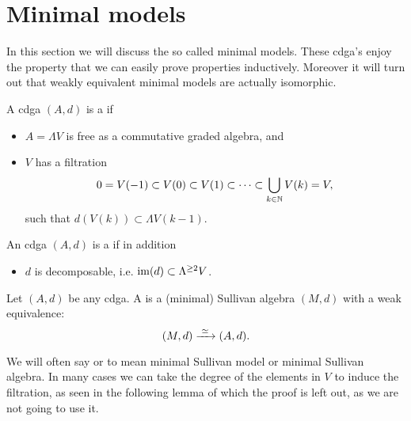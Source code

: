 
\chapter{Minimal models}
\label{sec:minimal-models}

In this section we will discuss the so called minimal models. These cdga's enjoy the property that we can easily prove properties inductively. Moreover it will turn out that weakly equivalent minimal models are actually isomorphic.

\begin{definition}
	A cdga $(A, d)$ is a  if
	\begin{itemize}
		\item $A = \Lambda V$ is free as a commutative graded algebra, and
		\item $V$ has a filtration
		$$ 0 = V(-1) \subset V(0) \subset V(1) \subset \cdots \subset \bigcup_{k \in \mathbb{N}} V(k) = V, $$
		such that $d(V(k)) \subset \Lambda V(k-1)$.
	\end{itemize}

	An cdga $(A, d)$ is a  if in addition
	\begin{itemize}
		\item $d$ is decomposable, i.e. $\operatorname*{im}(d) \subset \Lambda^{\geq 2}V$.
	\end{itemize}
\end{definition}

\begin{definition}
	Let $(A, d)$ be any cdga. A  is a (minimal) Sullivan algebra $(M, d)$ with a weak equivalence:
	$$ (M, d) \xrightarrow{\,\,{\simeq}\,\,} (A, d). $$
\end{definition}

We will often say  or  to mean minimal Sullivan model or minimal Sullivan algebra. In many cases we can take the degree of the elements in $V$ to induce the filtration, as seen in the following lemma of which the proof is left out, as we are not going to use it.


